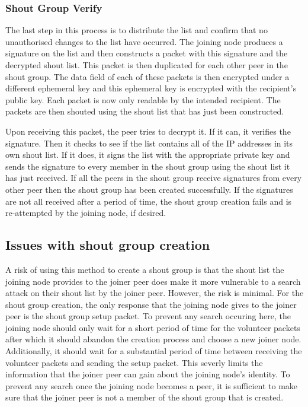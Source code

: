 \documentclass[ %
                    author={Luke Murray},
                supervisor={Dr. Simon Hollis},
                     title={Shadow Peer-to-Peer Networks},
                  subtitle={},
                    degree={MEng},
                      year={2013} ]{thesis}
\begin{document}

\subsubsection{Shout Group Verify}

The last step in this process is to distribute the list and confirm that no unauthorised changes to the list have occurred. The joining node produces a signature on the list and then constructs a packet with this signature and the decrypted shout list. This packet is then duplicated for each other peer in the shout group. The data field of each of these packets is then encrypted under a different ephemeral key and this ephemeral key is encrypted with the recipient's public key. Each packet is now only readable by the intended recipient. The packets are then shouted using the shout list that has just been constructed.

Upon receiving this packet, the peer tries to decrypt it. If it can, it verifies the signature. Then it checks to see if the list contains all of the IP addresses in its own shout list. If it does, it signs the list with the appropriate private key and sends the signature to every member in the shout group using the shout list it has just received. If all the peers in the shout group receive signatures from every other peer then the shout group has been created successfully. If the signatures are not all received after a period of time, the shout group creation fails and is re-attempted by the joining node, if desired.

\subsection{Issues with shout group creation}

A risk of using this method to create a shout group is that the shout list the joining node provides to the joiner peer does make it more vulnerable to a search attack on their shout list by the joiner peer. However, the risk is minimal. For the shout group creation, the only response that the joining node gives to the joiner peer is the shout group setup packet. To prevent any search occuring here, the joining node should only wait for a short period of time for the volunteer packets after which it should abandon the creation process and choose a new joiner node. Additionally, it should wait for a substantial period of time between receiving the volunteer packets and sending the setup packet. This severly limits the information that the joiner peer can gain about the joining node's identity. To prevent any search once the joining node becomes a peer, it is sufficient to make sure that the joiner peer is not a member of the shout group that is created.
\end{document}
